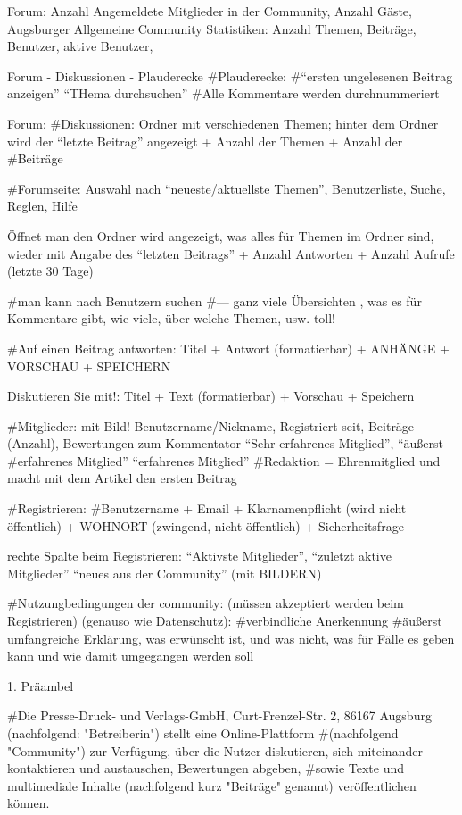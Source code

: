 Forum:
Anzahl Angemeldete Mitglieder in der Community, Anzahl Gäste, Augsburger Allgemeine Community Statistiken: Anzahl Themen, Beiträge, Benutzer, aktive Benutzer, 


Forum - Diskussionen - Plauderecke
#Plauderecke:
#``ersten ungelesenen Beitrag anzeigen'' ``THema durchsuchen''
#Alle Kommentare werden durchnummeriert

Forum: 
#Diskussionen: Ordner mit verschiedenen Themen; hinter dem Ordner wird der ``letzte Beitrag'' angezeigt + Anzahl der Themen + Anzahl der #Beiträge

#Forumseite: Auswahl nach ``neueste/aktuellste Themen'', Benutzerliste, Suche, Reglen, Hilfe

Öffnet man den Ordner wird angezeigt, was alles für Themen im Ordner sind, wieder mit Angabe des ``letzten Beitrags'' + Anzahl Antworten + Anzahl Aufrufe (letzte 30 Tage)

#man kann nach Benutzern suchen
#--- ganz viele Übersichten , was es für Kommentare gibt, wie viele, über welche Themen, usw. toll!

#Auf einen Beitrag antworten: Titel + Antwort (formatierbar) + ANHÄNGE + VORSCHAU + SPEICHERN

Diskutieren Sie mit!: Titel + Text (formatierbar) + Vorschau + Speichern

#Mitglieder: mit Bild! Benutzername/Nickname, Registriert seit, Beiträge (Anzahl), Bewertungen zum Kommentator ``Sehr erfahrenes Mitglied'',  ``äußerst #erfahrenes Mitglied'' ``erfahrenes Mitglied''
#Redaktion = Ehrenmitglied und macht mit dem Artikel den ersten Beitrag

#Registrieren:
#Benutzername + Email + Klarnamenpflicht (wird nicht öffentlich) + WOHNORT (zwingend, nicht öffentlich) + Sicherheitsfrage

rechte Spalte beim Registrieren: ``Aktivste Mitglieder'', ``zuletzt aktive Mitglieder'' ``neues aus der Community'' (mit BILDERN)

#Nutzungbedingungen der community: (müssen akzeptiert werden beim Registrieren) (genauso wie Datenschutz):
#verbindliche Anerkennung
 #äußerst umfangreiche Erklärung, was erwünscht ist, und was nicht, was für Fälle es geben kann und wie damit umgegangen werden soll 

1. Präambel

#Die Presse-Druck- und Verlags-GmbH, Curt-Frenzel-Str. 2, 86167 Augsburg (nachfolgend: "Betreiberin") stellt eine Online-Plattform #(nachfolgend "Community") zur Verfügung, über die Nutzer diskutieren, sich miteinander kontaktieren und austauschen, Bewertungen abgeben, #sowie Texte und multimediale Inhalte (nachfolgend kurz "Beiträge" genannt) veröffentlichen können.

